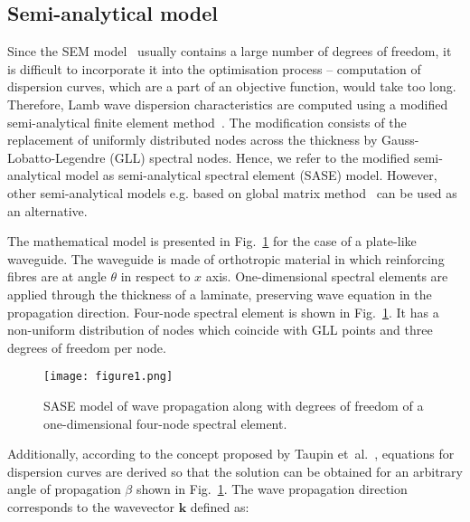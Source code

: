 \documentclass[preprint,12pt]{elsarticle}
\newcommand{\vect}[1]{\mathbf{#1}} %
\providecommand{\DIFaddbeginFL}{} %
\providecommand{\DIFaddendFL}{} %
\providecommand{\DIFdelbeginFL}{} %
\providecommand{\DIFdelendFL}{} %
\begin{document}
\subsection{Semi-analytical model}
Since the SEM model~\cite{Kudela2020a,Rucka2011} usually contains a large number of degrees of freedom, it is difficult to incorporate it into the optimisation process – computation of dispersion curves, which are a part of an objective function, would take too long. 
Therefore, Lamb wave dispersion characteristics are computed using a modified semi-analytical finite element method~\cite{Bartoli2006,Marzani2008}. 
The modification consists of the replacement of uniformly distributed nodes across the thickness by Gauss-Lobatto-Legendre (GLL) spectral nodes. 
Hence, we refer to the modified semi-analytical model as semi-analytical spectral element (SASE) model.
However, other semi-analytical models e.g. based on global matrix method~\cite{Pol2013} can be used as an alternative.

The mathematical model is presented in Fig.~\ref{fig:layered_composite_SASE} for the case of a plate-like waveguide.  
The waveguide is made of orthotropic material in which reinforcing fibres are at angle $\theta$ in respect to $x$ axis.
One-dimensional spectral elements are applied through the thickness of a laminate, preserving wave equation in the propagation direction.  
Four-node spectral element is shown in Fig.~\ref{fig:layered_composite_SASE}. 
It has a non-uniform distribution of nodes which coincide with GLL points and three degrees of freedom per node.

\begin{figure} [h!]
	\centering
	\DIFdelbeginFL %
\DIFdelendFL \DIFaddbeginFL \texttt{[image: figure1.png]}
	\DIFaddendFL %
	\caption{SASE model of wave propagation along with degrees of freedom of a one-dimensional four-node spectral element.}
	\label{fig:layered_composite_SASE}
\end{figure}

Additionally, according to the concept proposed by Taupin et~al.~\cite{Taupin2011}, equations for dispersion curves are derived so that the solution can be obtained for an arbitrary angle of propagation $\beta$ shown in Fig.~\ref{fig:layered_composite_SASE}. 
The wave propagation direction corresponds to the wavevector $\vect{k}$ defined as:
\end{document}
